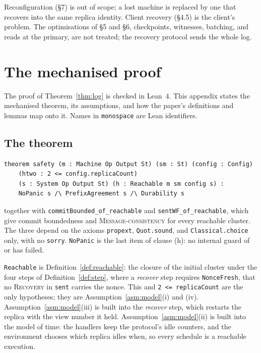 \documentclass[11pt,a4paper]{article}
\theoremstyle{plain}
\theoremstyle{definition}
\theoremstyle{remark}
\newcommand{\msg}[1]{\textsc{#1}}
\newcommand{\WellFormed}{\textsc{Message-consistency}}
\begin{document}
Reconfiguration (\S7) is out of scope; a lost machine is replaced by one
that recovers into the same replica identity. Client recovery (\S4.5) is
the client's problem. The optimisations of \S5 and \S6, checkpoints,
witnesses, batching, and reads at the primary, are not treated; the
recovery protocol sends the whole log.

\section{The mechanised proof}
\label{app:lean}

The proof of Theorem~\ref{thm:log} is checked in Lean~4. This appendix
states the mechanised theorem, its assumptions, and how the paper's
definitions and lemmas map onto it. Names in \texttt{monospace} are Lean
identifiers.

\subsection{The theorem}

\begin{verbatim}
theorem safety (m : Machine Op Output St) (sm : St) (config : Config)
    (htwo : 2 <= config.replicaCount)
    (s : System Op Output St) (h : Reachable m sm config s) :
    NoPanic s /\ PrefixAgreement s /\ Durability s
\end{verbatim}

together with
\texttt{commitBounded\_of\_reachable} and \texttt{sentWF\_of\_reachable},
which give commit boundedness and \WellFormed{} for every reachable
cluster. The three depend on the axioms \texttt{propext},
\texttt{Quot.sound}, and \texttt{Classical.choice} only, with no
\texttt{sorry}. \texttt{NoPanic} is the last item of clause (h): no
internal guard of  or  has failed.

\texttt{Reachable} is Definition~\ref{def:reachable}: the closure of the
initial cluster under the four steps of Definition~\ref{def:step}, where a
\emph{recover} step requires \texttt{NonceFresh}, that no \msg{Recovery}
in \texttt{sent} carries the nonce. This and \texttt{2 <= replicaCount}
are the only hypotheses; they are Assumption~\ref{asm:model}(i) and (iv).
Assumption~\ref{asm:model}(iii) is built into the \emph{recover} step,
which restarts the replica with the view number it held.
Assumption~\ref{asm:model}(ii) is built into the model of time: the
handlers keep the protocol's idle counters, and the environment chooses
which replica idles when, so every schedule is a reachable execution.
\end{document}
